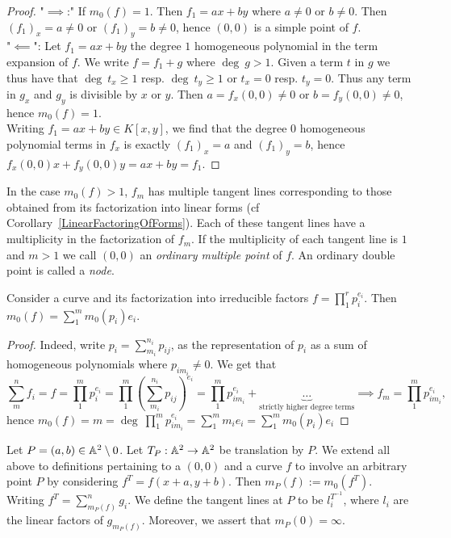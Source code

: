     \begin{proof} 
        "$\implies$:" If $m_0(f)=1$. Then $f_1=ax+by$ where $a\neq 0$ or $b\neq 0$. Then $(f_1)_x= a\neq 0$ or $(f_1)_y=b\neq 0$, hence $(0,0)$ is a simple point of $f$. \\
        "$\impliedby$": Let $f_1=ax+by$ the degree $1$ homogeneous polynomial in the term expansion of $f$. We write $f=f_1+g$ where $\deg \ g >1$. Given a term $t$ in $g$ we thus have that $\deg\ t_x\geq 1$ resp. $\deg \ t_y\geq 1 $ or $t_x=0$ resp. $t_y=0$. Thus any term in $g_x$ and $g_y$ is divisible by $x$ or $y$. Then $a =f_x(0,0)\neq0$ or $b=f_y(0,0)\neq0$, hence $m_0(f)=1$.\\
        Writing $f_1 = ax+by\in K[x,y]$, we find that the degree $0$ homogeneous polynomial terms in $f_x$ is exactly $(f_1)_x=a$ and $(f_1)_y=b$, hence $f_x(0,0)x+f_y(0,0)y = ax+by=f_1$.
    \end{proof}
    \begin{remark}
        In the case $m_0(f)>1$, $f_m$ has multiple tangent lines corresponding to those obtained from its factorization into linear forms (cf Corollary~\ref{LinearFactoringOfForms}). Each of these tangent lines have a multiplicity in the factorization of $f_m$. If the multiplicity of each tangent line is $1$ and $m>1$ we call $(0,0)$ an \textit{ordinary multiple point} of $f$. An ordinary double point is called a \textit{node}. 
    \end{remark}
    \begin{lemma}
        Consider a curve and its factorization into irreducible factors $f=\prod_1^r p_i^{e_i}$. Then $m_0(f)=\sum_1^m m_0(p_i)e_i$.
    \end{lemma}
    \begin{proof}
        Indeed, write $p_i=\sum_{m_i}^{n_i} p_{ij}$, as the representation of $p_i$ as a sum of homogeneous polynomials where $p_{im_i}\neq 0$. We get that 
        $$\sum_m^n f_i= f = \prod_1^m p_i^{e_i} = \prod_1^m \left(\sum_{m_i}^{n_i} p_{ij}\right)^{e_i} = \prod_1^{m} p_{im_i}^{e_i} + \underbrace{\dots}_\text{strictly higher degree terms}\implies f_m = \prod_1^m p_{im_i}^{e_i},$$
        hence $m_0(f)=m = \deg \ \prod_1^m p_{im_i}^{e_i} = \sum_1^m m_ie_i= \sum_1^m m_0(p_i)e_i$
    \end{proof}
    \begin{definition}
        Let $P=(a,b)\in \mathbb{A}^2\setminus 0$. Let $T_P : \mathbb{A}^2 \rightarrow \mathbb{A}^2$ be translation by $P$. We extend all above to definitions pertaining to a $(0,0)$ and a curve $f$ to involve an arbitrary point $P$ by considering $f^T= f(x+a,y+b)$. Then $m_P(f):= m_0(f^T)$. Writing $f^T = \sum_{m_P(f)}^n g_i$. We define the tangent lines at $P$ to be $l_i^{T^{-1}}$, where $l_i$ are the linear factors of $g_{m_P(f)}$. Moreover, we assert that $m_P(0)=\infty$.
    \end{definition}
